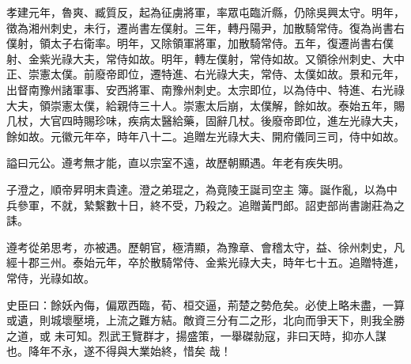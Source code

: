 \begin{pinyinscope}
 孝建元年，魯爽、臧質反，起為征虜將軍，率眾屯臨沂縣，仍除吳興太守。明年，徵為湘州刺史，未行，遷尚書左僕射。三年，轉丹陽尹，加散騎常侍。復為尚書右僕射，領太子右衛率。明年，又除領軍將軍，加散騎常侍。五年，復遷尚書右僕射、金紫光祿大夫，常侍如故。明年，轉左僕射，常侍如故。又領徐州刺史、大中正、崇憲太僕。前廢帝即位，遷特進、右光祿大夫，常侍、太僕如故。景和元年，
 出督南豫州諸軍事、安西將軍、南豫州刺史。太宗即位，以為侍中、特進、右光祿大夫，領崇憲太僕，給親侍三十人。崇憲太后崩，太僕解，餘如故。泰始五年，賜几杖，大官四時賜珍味，疾病太醫給藥，固辭几杖。後廢帝即位，進左光祿大夫，餘如故。元徽元年卒，時年八十二。追贈左光祿大夫、開府儀同三司，侍中如故。



 謚曰元公。遵考無才能，直以宗室不遠，故歷朝顯遇。年老有疾失明。



 子澄之，順帝昇明末貴達。澄之弟琨之，為竟陵王誕司空主
 簿。誕作亂，以為中兵參軍，不就，縶繫數十日，終不受，乃殺之。追贈黃門郎。詔吏部尚書謝莊為之誄。



 遵考從弟思考，亦被遇。歷朝官，極清顯，為豫章、會稽太守，益、徐州刺史，凡經十郡三州。泰始元年，卒於散騎常侍、金紫光祿大夫，時年七十五。追贈特進，常侍，光祿如故。



 史臣曰：餘妖內侮，偏眾西臨，荀、桓交逼，荊楚之勢危矣。必使上略未盡，一算或遺，則城壞壓境，上流之難方結。敵資三分有二之形，北向而爭天下，則我全勝之道，或
 未可知。烈武王覽群才，揚盛策，一舉磔勍寇，非曰天時，抑亦人謀也。降年不永，遂不得與大業始終，惜矣
 哉！



\end{pinyinscope}